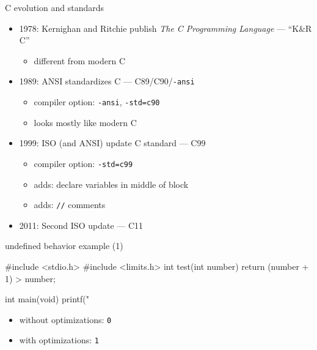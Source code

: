 \begin{frame}[fragile,label=cEvolve]{C evolution and standards}
\begin{itemize}
\item 1978: Kernighan and Ritchie publish {\it The C Programming Language} --- ``K\&R C''
    \begin{itemize}
        \item {} different from modern C
    \end{itemize}

\item<2-> 1989: ANSI standardizes C --- C89/C90/{\tt -ansi}
    \begin{itemize}
        \item compiler option: {\tt -ansi}, {\tt -std=c90}
        \item looks mostly like modern C
    \end{itemize}

\item<3-> 1999: ISO (and ANSI) update C standard --- C99
    \begin{itemize}
        \item compiler option: {\tt -std=c99}
        \item adds: declare variables in middle of block
        \item adds: \lstinline|//| comments
    \end{itemize}

\item<4-> 2011: Second ISO update --- C11
\end{itemize}
\end{frame}


\begin{frame}[fragile,label=undefExample1]{undefined behavior example (1)}
\begin{ccodeNL}
#include <stdio.h>
#include <limits.h>
int test(int number) {
    return (number + 1) > number;
}

int main(void) {
    printf("%
}
\end{ccodeNL}
\begin{itemize}
\item<2-> without optimizations: \lstinline|0|
\item<3-> with optimizations: \lstinline|1|
\end{itemize}
\end{frame}

